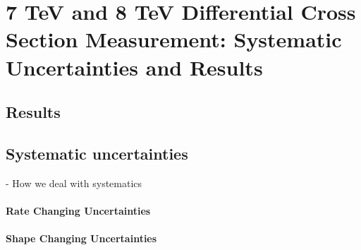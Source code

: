 \chapter{7 TeV and 8 TeV Differential Cross Section Measurement: Systematic Uncertainties and Results}
\label{c:Differential_Cross_Section:systematics_and_results}

\section{Results}
\label{s:results}

\section{Systematic uncertainties}
\label{s:systematic_uncertainties}
		- How we deal with systematics

\subsubsection{Rate Changing Uncertainties}
\label{sss:rate_changing_uncertainties}

\subsubsection{Shape Changing Uncertainties}
\label{sss:shape_changing_uncertainties}
		

